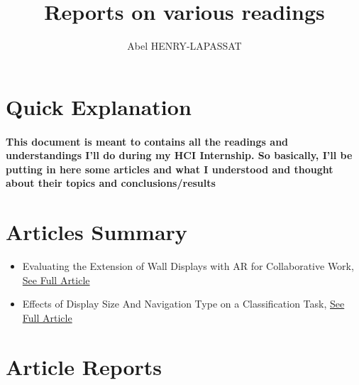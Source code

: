\documentclass{article}
\title{Reports on various readings}
\author{Abel HENRY-LAPASSAT}
\begin{document}
\maketitle
\section{Quick Explanation}
    \paragraph{ \textnormal{This document is meant to contains all the readings and understandings I'll do during my HCI Internship.
        So basically, I'll be putting in here some articles and what I understood and thought about their topics and conclusions/results} }

\section{Articles Summary}
    \begin{itemize}
        \item Evaluating the Extension of Wall Displays with AR for Collaborative Work, \href{https://hal.science/hal-04010673/document}{See Full Article}
        \item Effects of Display Size And Navigation Type on a Classification Task, \href{https://hal.science/file/index/docid/957269/filename/chi14-classify-hal-v1.pdf}{See Full Article}
    \end{itemize}

\section{Article Reports}

    
    
\end{document}
